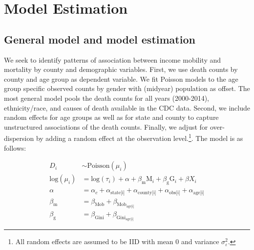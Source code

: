 \documentclass[11pt]{article}
\begin{document}

\section{Model Estimation}

\subsection{General model and model estimation}

We seek to identify patterns of association between income mobility and mortality by county and demographic variables. First, we use death counts by county and age group as dependent variable. We fit Poisson models to the age group specific observed counts by gender with (midyear) population as offset. The most general model pools the death counts for all years (2000-2014), ethnicity/race, and causes of death available in the CDC data. Second, we include random effects for age groups as well as for state and county to capture unstructured associations of the death counts. Finally, we adjust for over-dispersion by adding a random effect at the observation level.\footnote{All random effects are assumed to be IID with mean 0 and variance $\sigma^2_{\varepsilon}$.}. The model is as follows:


\begin{align}
  D_{i} & \sim \text{Poisson}(\mu_i) \nonumber \\
 \text{log}(\mu_i) & = \text{log}(\tau_{i}) + \alpha + \beta_{ \text{m}} \text{M}_{i} + \beta_{\text{g}} \text{G}_{i} + \beta X_{i} \nonumber \\
    \alpha & =  \alpha_c + \alpha_{\text{state[i]}} + \alpha_{\text{county[i]}} +  \alpha_{\text{obs[i]}} + \alpha_{\text{age[i]}} \nonumber  \\ 
  \beta_{\text{m}}  & = \beta_{\text{Mob}} + 
  \beta_{\text{Mob}_{\text{age[i]}}} \nonumber  \\ 
   \beta_{\text{g}}  & = \beta_{\text{Gini}} + \beta_{\text{Gini}_{\text{age[i]}}} \label{eq:model_age}
\end{align}


\end{document}
